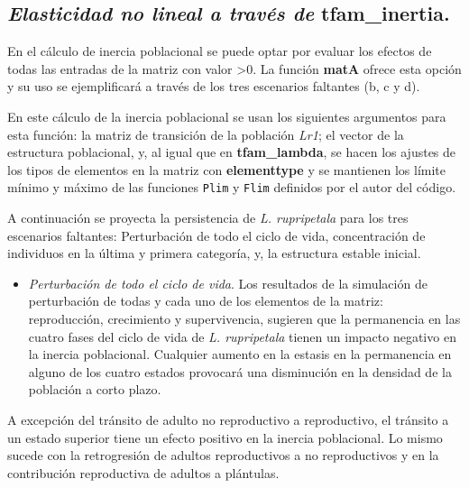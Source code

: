 \documentclass[
  12pt,
  letterpaper,
]{book}
\providecommand{\tightlist}{%
  \setlength{\itemsep}{0pt}\setlength{\parskip}{0pt}}\usepackage{longtable,booktabs,array}
\begin{document}
\subsection{\texorpdfstring{\emph{Elasticidad no lineal a través de}
\textbf{tfam\_inertia}.}{Elasticidad no lineal a través de tfam\_inertia.}}\label{elasticidad-no-lineal-a-travuxe9s-de-tfam_inertia.}

En el cálculo de inercia poblacional se puede optar por evaluar los
efectos de todas las entradas de la matriz con valor \textgreater0. La
función \textbf{matA} ofrece esta opción y su uso se ejemplificará a
través de los tres escenarios faltantes (b, c y d).

En este cálculo de la inercia poblacional se usan los siguientes
argumentos para esta función: la matriz de transición de la población
\emph{Lr1}; el vector de la estructura poblacional, y, al igual que en
\textbf{tfam\_lambda}, se hacen los ajustes de los tipos de elementos en
la matriz con \textbf{elementtype} y se mantienen los límite mínimo y
máximo de las funciones \texttt{Plim} y \texttt{Flim} definidos por el
autor del código.

A continuación se proyecta la persistencia de \emph{L. rupripetala} para
los tres escenarios faltantes: Perturbación de todo el ciclo de vida,
concentración de individuos en la última y primera categoría, y, la
estructura estable inicial.

\begin{itemize}
\tightlist
\item
  \emph{Perturbación de todo el ciclo de vida}. Los resultados de la
  simulación de perturbación de todas y cada uno de los elementos de la
  matriz: reproducción, crecimiento y supervivencia, sugieren que la
  permanencia en las cuatro fases del ciclo de vida de \emph{L.
  rupripetala} tienen un impacto negativo en la inercia poblacional.
  Cualquier aumento en la estasis en la permanencia en alguno de los
  cuatro estados provocará una disminución en la densidad de la
  población a corto plazo.
\end{itemize}

A excepción del tránsito de adulto no reproductivo a reproductivo, el
tránsito a un estado superior tiene un efecto positivo en la inercia
poblacional. Lo mismo sucede con la retrogresión de adultos
reproductivos a no reproductivos y en la contribución reproductiva de
adultos a plántulas.
\end{document}
